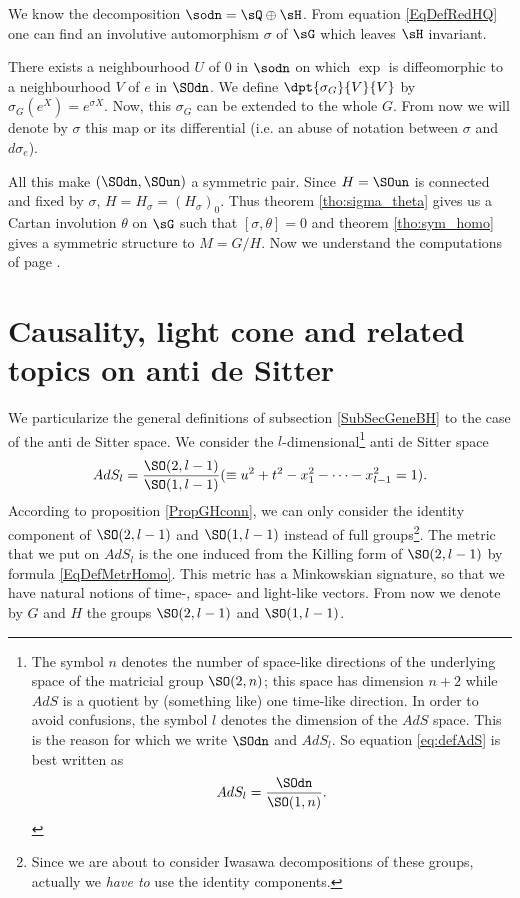 We know the decomposition $\sodn=\sQ\oplus\sH$. From equation \eqref{EqDefRedHQ} one can find an involutive automorphism $\sigma$ of $\sG$ which leaves $\sH$ invariant. 

There exists a neighbourhood $U$ of $0$ in $\sodn$ on which $\exp$ is diffeomorphic to a neighbourhood $V$ of $e$ in $\SOdn$. We define $\dpt{\sigma_G}{V}{V}$ by $\sigma_G(e^X)=e^{\sigma X}$. Now, this $\sigma_G$ can be extended to the whole $G$. From now we will denote by $\sigma$ this map or its differential (i.e. an abuse of notation between $\sigma$ and $d\sigma_e$).

  
All this make $(\SOdn,\SOun)$ a symmetric pair. Since $H=\SOun$ is connected and fixed by $\sigma$, $H=H_{\sigma}=(H_{\sigma})_0$. Thus theorem  \ref{tho:sigma_theta} gives us a Cartan involution $\theta$ on $\sG$ such that $[\sigma,\theta]=0$ and theorem \ref{tho:sym_homo} gives a symmetric structure to $M=G/H$. Now we understand the computations of page \pageref{pg:calcul_sigma_theta}.

\section{Causality, light cone and related topics on anti de Sitter} \label{SecCausal}

We particularize the general definitions of subsection \ref{SubSecGeneBH} to the case of the anti de Sitter space. We consider the $l$-dimensional\footnote{The symbol $n$ denotes the number of space-like directions of the underlying space of the matricial group $\SO(2,n)$; this space has dimension $n+2$ while $AdS$ is a quotient by (something like) one time-like direction. In order to avoid confusions, the symbol $l$ denotes the dimension of the $AdS$ space. This is the reason for which we write $\SOdn$ and $AdS_l$. %
    So equation \eqref{eq:defAdS} is best written as \[AdS_l=\frac{\SOdn}{\SO(1,n)}.\]} anti de Sitter space
\begin{equation}    \label{eq:defAdS}
  AdS_l=\frac{ \SO(2,l-1) }{ \SO(1,l-1) }(\equiv u^2+t^2-x_1^2-\cdots-x_{l-1}^2=1).
 \end{equation}
According to proposition \ref{PropGHconn}, we can only consider the identity component of $\SO(2,l-1)$ and $\SO(1,l-1)$ instead of full groups\footnote{Since we are about to consider Iwasawa decompositions of these groups, actually we \emph{have to} use the identity components.}. The metric that we put on $AdS_l$ is the one induced from the Killing form of $\SO(2,l-1)$ by formula \eqref{EqDefMetrHomo}. This metric has a Minkowskian signature, so that we have  natural notions of time-, space- and light-like vectors. From now we denote by $G$ and $H$ the groups $\SO(2,l-1)$ and $\SO(1,l-1)$. 

